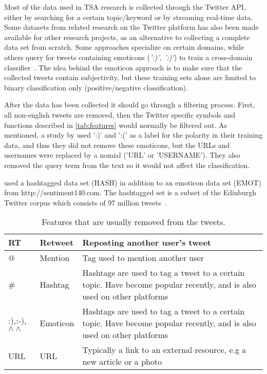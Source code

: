 Most of the data used in TSA research is collected through the Twitter API, either by searching for a certain topic/keyword or by streaming real-time data. Some datasets from related research on the Twitter platform has also been made available for other research projects, as an alternative to collecting a complete data set from scratch. Some approaches specialize on certain domains, while others query for tweets containing emoticons (\emph{':)', ':)'}) to train a cross-domain classifier~\citep{article:go}. The idea behind the emoticon approach is to make sure that the collected tweets contain subjectivity, but these training sets alone are limited to binary classification only (positive/negative classification).

After the data has been collected it should go through a filtering process. First, all non-english tweets are removed, then the Twitter specific symbols and functions described in \autoref{tab:features} would normally be filtered out. As mentioned, a study by \cite{article:go} used ':)' and ':(' as a label for the polarity in their training data, and thus they did not remove these emoticons, but the URLs and usernames were replaced by a nomial ('URL' or 'USERNAME'). They also removed the query term from the text so it would not affect the classification.

\cite{article:omg} used a hashtagged data set (HASH) in addition to an emoticon data set (EMOT) from http://sentiment140.com. The hashtagged set is a subset of the Edinburgh Twitter corpus which consists of 97 million tweets~\citep{article:edinburgh}.

\begin{table}[]
\centering
\begin{tabular}{|l|l|p{8cm}|}
\hline
RT & Retweet & Reposting another user’s tweet \\ \hline
@ & Mention & Tag used to mention another user \\ \hline
\# & Hashtag & Hashtags are used to tag a tweet to a certain topic. Have become popular recently, and is also used on other platforms \\ \hline
:),:-),$\wedge\wedge$ & Emoticon & Hashtags are used to tag a tweet to a certain topic. Have become popular recently, and is also used on other platforms \\ \hline
URL & URL & Typically a link to an external resource, e.g a new article or a photo \\ \hline
\end{tabular}
\caption{Features that are usually removed from the tweets.}
\label{tab:features}
\end{table}


